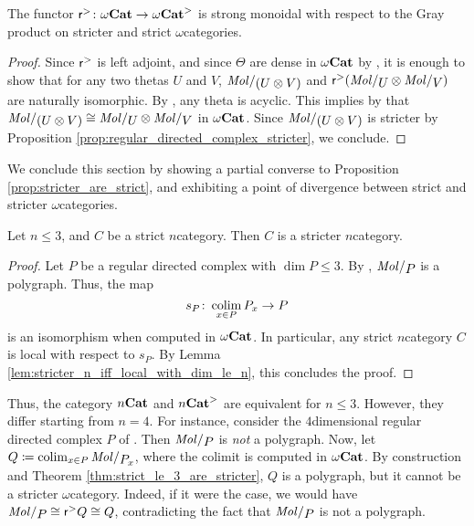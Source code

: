 \begin{prop} \label{prop:reflection_to_stricter_monoidal}
    The functor \( \mathsf{r}^{>} \colon {\omega\mathbf{Cat}} \to {\omega\mathbf{Cat}}^> \) is strong monoidal with respect to the Gray product on stricter and strict \( \omega \)\nbd categories.
\end{prop}
\begin{proof}
    Since \( \mathsf{r}^{>} \) is left adjoint, and since \( \Theta \) are dense in \( {\omega\mathbf{Cat}} \) by \cite[Proposition 4.6]{ara2020joint}, it is enough to show that for any two thetas \( U \) and \( V \), \( \molecin{(U \gray V)} \) and \( \rcs (\molecin{U} \gray \molecin{V}) \) are naturally isomorphic. 
    By \cite[Lemma 9.1.16]{hadzihasanovic2024combinatorics}, any theta is acyclic.
    This implies by \cite[Proposition 11.2.36]{hadzihasanovic2020diagrammatic} that \( \molecin{(U \gray V)} \cong \molecin{U} \gray \molecin{V} \) in \( {\omega\mathbf{Cat}} \).
    Since \( \molecin{(U \gray V)} \) is stricter by Proposition \ref{prop:regular_directed_complex_stricter}, we conclude.
\end{proof}

\noindent We conclude this section by showing a partial converse to Proposition \ref{prop:stricter_are_strict}, and exhibiting a point of divergence between strict and stricter \( \omega \)\nbd categories.

\begin{thm}\label{thm:strict_le_3_are_stricter}
    Let \( n \le 3 \), and \( C \) be a strict \( n \)\nbd category.
    Then \( C \) is a stricter \( n \)\nbd category.
\end{thm}
\begin{proof}
    Let \( P \) be a regular directed complex with \( \dim P \le 3 \).
    By \cite[Corollary 8.4.12]{hadzihasanovic2024combinatorics}, \( \molecin{P} \) is a polygraph.
    Thus, the map
    \begin{equation*}
        s_P \colon \operatorname*{colim}_{x \in P} {P}_{x} \to P 
    \end{equation*}
    is an isomorphism when computed in \( {\omega\mathbf{Cat}} \).
    In particular, any strict \( n \)\nbd category \( C \) is local with respect to \( s_P \).
    By Lemma \ref{lem:stricter_n_iff_local_with_dim_le_n}, this concludes the proof.
\end{proof}

\begin{comm} \label{comm:strict_are_not_stricter}
    Thus, the category \( {n\mathbf{Cat}} \) and \( {n\mathbf{Cat}}^> \) are equivalent for \( n \le 3 \).
    However, they differ starting from \( n = 4 \).
    For instance, consider the \( 4 \)\nbd dimensional regular directed complex \( P \) of \cite[Example 8.2.20]{hadzihasanovic2024combinatorics}.
    Then \( \molecin{P} \) is \emph{not} a polygraph.
    Now, let \( Q \eqdef \colim_{x \in P} \molecin{\imel{P}{x}} \), where the colimit is computed in \( {\omega\mathbf{Cat}} \).
    By construction and Theorem \ref{thm:strict_le_3_are_stricter}, \( Q \) is a polygraph, but it cannot be a stricter \( \omega \)\nbd category.
    Indeed, if it were the case, we would have \( \molecin{P} \cong \rcs Q \cong Q \), contradicting the fact that \( \molecin{P} \) is not a polygraph.
\end{comm}

